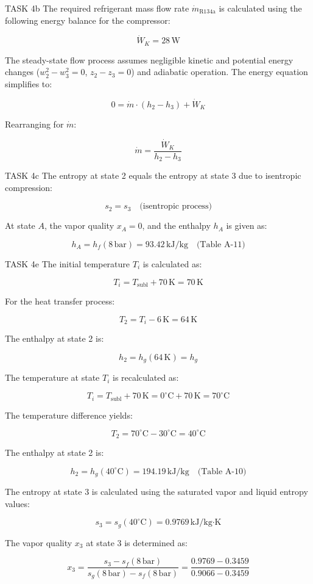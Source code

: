 TASK 4b  
The required refrigerant mass flow rate \( \dot{m}_{\text{R134a}} \) is calculated using the following energy balance for the compressor:  

\[
\dot{W}_K = 28 \, \text{W}
\]

The steady-state flow process assumes negligible kinetic and potential energy changes (\( w_2^2 - w_3^2 = 0 \), \( z_2 - z_3 = 0 \)) and adiabatic operation. The energy equation simplifies to:  

\[
0 = \dot{m} \cdot (h_2 - h_3) + \dot{W}_K
\]

Rearranging for \( \dot{m} \):  

\[
\dot{m} = \frac{\dot{W}_K}{h_2 - h_3}
\]

TASK 4c  
The entropy at state 2 equals the entropy at state 3 due to isentropic compression:  

\[
s_2 = s_3 \quad \text{(isentropic process)}
\]

At state \( A \), the vapor quality \( x_A = 0 \), and the enthalpy \( h_A \) is given as:  

\[
h_A = h_f (8 \, \text{bar}) = 93.42 \, \text{kJ/kg} \quad \text{(Table A-11)}
\]

TASK 4e  
The initial temperature \( T_i \) is calculated as:  

\[
T_i = T_{\text{subl}} + 70 \, \text{K} = 70 \, \text{K}
\]

For the heat transfer process:  

\[
T_2 = T_i - 6 \, \text{K} = 64 \, \text{K}
\]

The enthalpy at state 2 is:  

\[
h_2 = h_g (64 \, \text{K}) = h_g
\]

The temperature at state \( T_i \) is recalculated as:  

\[
T_i = T_{\text{subl}} + 70 \, \text{K} = 0^\circ \text{C} + 70 \, \text{K} = 70^\circ \text{C}
\]

The temperature difference yields:  

\[
T_2 = 70^\circ \text{C} - 30^\circ \text{C} = 40^\circ \text{C}
\]

The enthalpy at state 2 is:  

\[
h_2 = h_g (40^\circ \text{C}) = 194.19 \, \text{kJ/kg} \quad \text{(Table A-10)}
\]

The entropy at state 3 is calculated using the saturated vapor and liquid entropy values:  

\[
s_3 = s_g (40^\circ \text{C}) = 0.9769 \, \text{kJ/kg·K}
\]

The vapor quality \( x_3 \) at state 3 is determined as:  

\[
x_3 = \frac{s_3 - s_f (8 \, \text{bar})}{s_g (8 \, \text{bar}) - s_f (8 \, \text{bar})} = \frac{0.9769 - 0.3459}{0.9066 - 0.3459}
\]